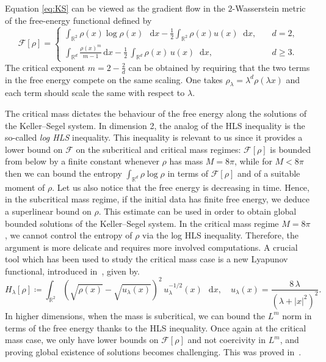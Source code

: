\documentclass[11pt,a4paper]{article}
\numberwithin{equation}{section}
\newcommand{\R}{{\mathbb{R}}}
\theoremstyle{plain}
\theoremstyle{remark}
\newcommand {\f}{\frac}
\newcommand{\diff}{\mathop{}\!\mathrm{d}}
\begin{document}
Equation \eqref{eq:KS} can be viewed as the gradient flow in the $2$-Wasserstein metric of the free-energy functional \cite{Otto01,Carrillo_McCann_Villani03,Ambrosio_Gigli_Savare08,Santambrogio15} defined by 
\begin{equation}\label{eq:free_energy}
\mathcal{F}[\rho]  =  
\begin{cases}
 \displaystyle \int_{\mathbb{R}^2}\rho(x)\log\rho(x) \,\diff x  - \f12 \int_{\mathbb{R}^2}\rho(x) u(x)\diff x, \quad & d=2,\\
 
  \displaystyle \int_{\mathbb{R}^d}\f{\rho(x)^m}{\,m-1\,}\,\mathrm{d}x  - \f12\,\int_{\mathbb{R}^d}\rho(x)\,u(x)\diff x, \quad & d\ge 3. 
\end{cases}
\end{equation}
The critical exponent $m=2-\f{2}{d}$ can be obtained by requiring that the two terms in the free energy compete on the same scaling. One takes $\rho_\lambda = \lambda ^d\rho(\lambda x)$ and each term should scale the same with respect to $\lambda$.


The critical mass dictates the behaviour of the free energy along the solutions of the Keller--Segel system. In dimension 2, the analog of the HLS inequality is the so-called {\it log HLS} inequality. This inequality is relevant to us since it provides a lower bound on $\mathcal{F}$ on the subcritical and critical mass regimes: $ \mathcal{F}[\rho]$ is bounded from below by a finite constant whenever $\rho$ has mass $M=8\pi$, while for $M<8\pi$ then we can bound the entropy $\int_{\R^d}\rho\log\rho$ in terms of $\mathcal{F}[\rho]$ and of a suitable moment of $\rho$. Let us also notice that the free energy is decreasing in time. Hence, in the subcritical mass regime, if the initial data has finite free energy,  we deduce a superlinear bound on $\rho$. This estimate can be used in order to obtain global bounded solutions of the Keller--Segel system. In the critical mass regime $M=8\pi$, we cannot control the entropy of $\rho$ via the log HLS inequality. Therefore, the argument is more delicate and requires more involved computations. A crucial tool which has been used to study the critical mass case is a new Lyapunov functional, introduced in~\cite{Blanchet_Carlen_Carrillo12}, given by.
 \[
 H_{\lambda}[\rho]  
   \coloneqq  
 \int_{\R^2}\! \left(\sqrt{\rho(x)} - \sqrt{u_\lambda(x)} \right)^{2}\,u_{\lambda}^{-1/2}(x)\,\diff x,
 \quad 
 u_{\lambda}(x)  
  =  
 \frac{8\,\lambda}{(\lambda + |x|^2)^2}.
 \]
%
%
In higher dimensions, when the mass is subcritical, we can bound the $L^{m}$ norm in terms of the free energy thanks to the HLS inequality. Once again at the critical mass case, we only have lower bounds on $\mathcal{F}[\rho]$ and not coercivity in $L^m$, and proving global existence of solutions becomes challenging. This was proved in~\cite{Blanchet_Carrillo_Laurencot09}.   
\end{document}

